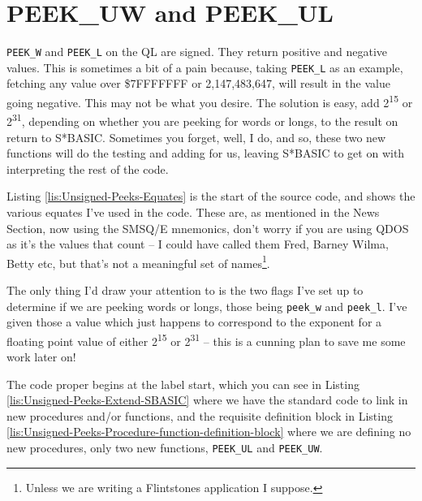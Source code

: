 \section{PEEK\_UW and PEEK\_UL}

\texttt{PEEK\_W} and \texttt{PEEK\_L} on the QL are signed. They return
positive and negative values. This is sometimes a bit of a pain because,
taking \texttt{PEEK\_L} as an example, fetching any value over \$7FFFFFFF
or 2,147,483,647, will result in the value going negative. This may
not be what you desire. The solution is easy, add 2\textsuperscript{15}
or 2\textsuperscript{31}, depending on whether you are peeking for
words or longs, to the result on return to S{*}BASIC. Sometimes you
forget, well, I do, and so, these two new functions will do the testing
and adding for us, leaving S{*}BASIC to get on with interpreting the
rest of the code.

Listing \ref{lis:Unsigned-Peeks-Equates} is the start of the source
code, and shows the various equates I've used in the code. These are,
as mentioned in the News Section, now using the SMSQ/E mnemonics,
don't worry if you are using QDOS as it's the values that count --
I could have called them Fred, Barney Wilma, Betty etc, but that's
not a meaningful set of names\footnote{Unless we are writing a Flintstones application I suppose.}. 



The only thing I'd draw your attention to is the two flags I've set
up to determine if we are peeking words or longs, those being \texttt{peek\_w}
and \texttt{peek\_l}. I've given those a value which just happens
to correspond to the exponent for a floating point value of either
2\textsuperscript{15} or 2\textsuperscript{31} -- this is a cunning
plan to save me some work later on!

The code proper begins at the label start, which you can see in Listing
\ref{lis:Unsigned-Peeks-Extend-SBASIC} where we have the standard
code to link in new procedures and/or functions, and the requisite
definition block in Listing \ref{lis:Unsigned-Peeks-Procedure-function-definition-block}
where we are defining no new procedures, only two new functions, \texttt{PEEK\_UL}
and \texttt{PEEK\_UW}.



